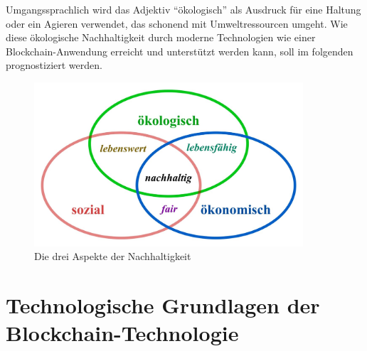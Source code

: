 Umgangssprachlich wird das Adjektiv ``ökologisch'' als Ausdruck für eine Haltung oder ein Agieren verwendet, das schonend mit Umweltressourcen umgeht\cite[13-23]{test123}. Wie diese ökologische Nachhaltigkeit durch moderne Technologien wie einer Blockchain-Anwendung erreicht und unterstützt werden kann, soll im folgenden prognostiziert werden.

\begin{figure}[ht!]
	\centering
	\includegraphics[width=100mm]{nachhaltig.jpg}
	\caption{Die drei Aspekte der Nachhaltigkeit\cite{oekologischeN} \label{overflow}}
\end{figure} 
\chapter{Technologische Grundlagen der Blockchain-Technologie}
